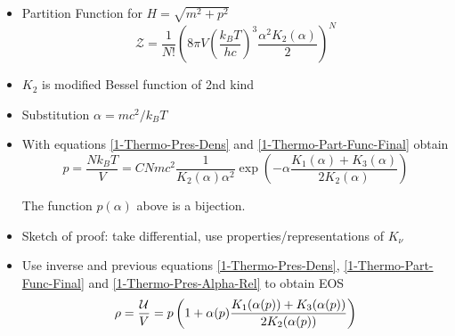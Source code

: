 \begin{frame}
	\begin{itemize}[<+->]
		\item Partition Function for $H=\sqrt{m^2+p^2}$
		\begin{equation}
			\mathcal{Z} = \frac{1}{N!}\left(8\pi V\left(\frac{k_BT}{hc}\right)^3\frac{\alpha^2 K_2(\alpha)}{2}\right)^N
			\label{1-Thermo-Part-Func-Final}
		\end{equation}
		\item $K_2$ is modified Bessel function of 2nd kind
		\item Substitution $\alpha=mc^2/k_BT$
		\item With equations \ref{1-Thermo-Pres-Dens} and \ref{1-Thermo-Part-Func-Final} obtain
		\begin{equation}
			p = \frac{Nk_BT}{V} = CNmc^2\frac{1}{K_2(\alpha)\alpha^2}\exp\left(-\alpha\frac{K_1(\alpha)+K_3(\alpha)}{2K_2(\alpha)}\right)
			\label{1-Thermo-Pres-Alpha-Rel}
		\end{equation}
		\begin{theorem}
			The function $p(\alpha)$ above is a bijection.
		\end{theorem}
		\item Sketch of proof: take differential, use properties/representations of $K_\nu$
		\item Use inverse and previous equations \ref{1-Thermo-Pres-Dens}, \ref{1-Thermo-Part-Func-Final} and \ref{1-Thermo-Pres-Alpha-Rel} to obtain EOS
		\begin{equation}
			\rho = \frac{\mathcal{U}}{V} = p\left(1+\alpha(p)\frac{K_1(\alpha(p))+K_3(\alpha(p))}{2K_2(\alpha(p))}\right)
		\end{equation}
	\end{itemize}
\end{frame}



